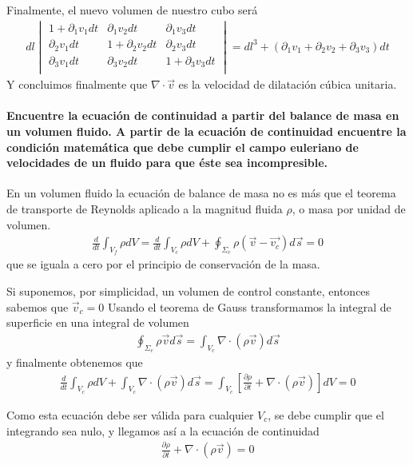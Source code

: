 \documentclass[a4paper]{article}
\begin{document}
Finalmente, el nuevo volumen de nuestro cubo será 
\begin{align*}
dl 
\begin{vmatrix}
	1 + \partial_1 v_1dt &\partial_1 v_2dt &\partial_1 v_3dt \\
	\partial_2 v_1dt &1 + \partial_2 v_2dt &\partial_2 v_3dt \\
	\partial_3 v_1dt &\partial_3 v_2dt &1 + \partial_3 v_3dt \\
\end{vmatrix}
= dl^3 + (\partial_1 v_1 + \partial_2 v_2 + \partial_3 v_3) dt
\end{align*}
Y concluimos finalmente que $\nabla\cdot \vec{v}$ es la velocidad
de dilatación cúbica unitaria.

\newpage
\paragraph{Encuentre la ecuación de continuidad a partir del
balance de masa en un volumen fluido. A partir de la ecuación de 
continuidad encuentre la condición matemática que debe cumplir
el campo euleriano de velocidades de un fluido para que éste sea
incompresible.} 

En un volumen fluido la ecuación de balance de masa no es más que 
el teorema de transporte de Reynolds aplicado a la magnitud fluida 
$\rho$, o masa por unidad de volumen. 
\begin{align*}
	\frac{d}{dt}\int_{V_f} \rho dV = \frac{d}{dt}\int_{V_c} \rho dV + \oint_{\Sigma_c} \rho (\vec{v} - \vec{v_c})d \vec{s} = 0
\end{align*}
que se iguala a cero por el principio de conservación de la masa.

Si suponemos, por simplicidad, un volumen de control constante, 
entonces sabemos que $\vec{v}_c= 0$
Usando el teorema de Gauss transformamos la integral de superficie 
en una integral de volumen 
\begin{align*}
	\oint_{\Sigma_c} \rho \vec{v} d\vec{s} = 
	\int_{V_c} \nabla \cdot (\rho \vec{v})d \vec{s} 
\end{align*}
y finalmente obtenemos que 
\begin{align*}
	\frac{d}{dt}\int_{V_c} \rho dV +	\int_{V_c} \nabla \cdot (\rho \vec{v})d \vec{s}  = \int_{V_c}\left[  \frac{\partial \rho}{\partial t} + \nabla\cdot (\rho \vec{v}) \right]dV  = 0
\end{align*}

Como esta ecuación debe ser válida para cualquier $V_c$, se debe cumplir
que el integrando sea nulo, y llegamos así a la ecuación de continuidad
\begin{align*}
  \frac{\partial \rho}{\partial t} + \nabla\cdot (\rho \vec{v}) = 0
\end{align*}
\end{document}
